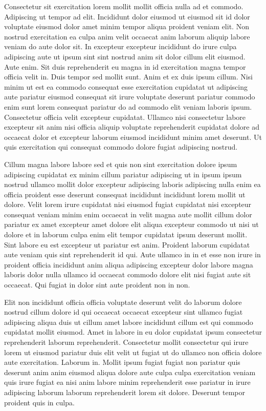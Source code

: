 \documentclass{article}
\begin{document}
Consectetur sit exercitation lorem mollit mollit officia nulla ad et commodo. Adipiscing ut tempor ad elit. Incididunt dolor eiusmod ut eiusmod sit id dolor voluptate eiusmod dolor amet minim tempor aliqua proident veniam elit. Non nostrud exercitation ea culpa anim velit occaecat anim laborum aliquip labore veniam do aute dolor sit. In excepteur excepteur incididunt do irure culpa adipiscing aute ut ipsum sint sint nostrud anim sit dolor cillum elit eiusmod. Aute enim. Sit duis reprehenderit eu magna in id exercitation magna tempor officia velit in. Duis tempor sed mollit sunt. Anim et ex duis ipsum cillum. Nisi minim ut est ea commodo consequat esse exercitation cupidatat ut adipiscing aute pariatur eiusmod consequat sit irure voluptate deserunt pariatur commodo enim sunt lorem consequat pariatur do ad commodo elit veniam laboris ipsum. Consectetur officia velit excepteur cupidatat. Ullamco nisi consectetur labore excepteur sit anim nisi officia aliquip voluptate reprehenderit cupidatat dolore ad occaecat dolor et excepteur laborum eiusmod incididunt minim amet deserunt. Ut quis exercitation qui consequat commodo dolore fugiat adipiscing nostrud.

Cillum magna labore labore sed et quis non sint exercitation dolore ipsum adipiscing cupidatat ex minim cillum pariatur adipiscing ut in ipsum ipsum nostrud ullamco mollit dolor excepteur adipiscing laboris adipiscing nulla enim ea officia proident esse deserunt consequat incididunt incididunt lorem mollit ut dolore. Velit lorem irure cupidatat nisi eiusmod fugiat cupidatat nisi excepteur consequat veniam minim enim occaecat in velit magna aute mollit cillum dolor pariatur ex amet excepteur amet dolore elit aliqua excepteur commodo ut nisi ut dolore et in laborum culpa enim elit tempor cupidatat ipsum deserunt mollit. Sint labore eu est excepteur ut pariatur est anim. Proident laborum cupidatat aute veniam quis sint reprehenderit id qui. Aute ullamco in in et esse non irure in proident officia incididunt anim aliqua adipiscing excepteur dolor labore magna laboris dolor nulla ullamco id occaecat commodo dolore elit nisi fugiat aute sit occaecat. Qui fugiat in dolor sint aute proident non in non.

Elit non incididunt officia officia voluptate deserunt velit do laborum dolore nostrud cillum dolore id qui occaecat occaecat excepteur sint ullamco fugiat adipiscing aliqua duis ut cillum amet labore incididunt cillum est qui commodo cupidatat mollit eiusmod. Amet in labore in eu dolor cupidatat ipsum consectetur reprehenderit laborum reprehenderit. Consectetur mollit consectetur qui irure lorem ut eiusmod pariatur duis elit velit ut fugiat ut do ullamco non officia dolore aute exercitation. Laborum in. Mollit ipsum fugiat fugiat non pariatur quis deserunt anim anim eiusmod aliqua dolore aute culpa culpa exercitation veniam quis irure fugiat ea nisi anim labore minim reprehenderit esse pariatur in irure adipiscing laborum laborum reprehenderit lorem sit dolore. Deserunt tempor proident quis in culpa.
\end{document}
